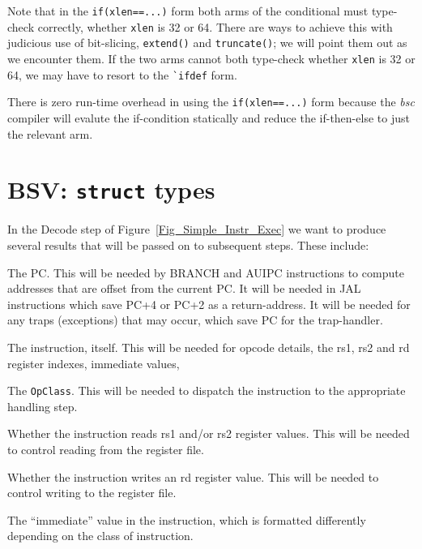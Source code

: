 Note that in the \verb|if(xlen==...)| form both arms of the
conditional must type-check correctly, whether \verb|xlen| is 32 or
64.  There are ways to achieve this with judicious use of bit-slicing,
\verb|extend()| and \verb|truncate()|; we will point them out as we
encounter them.  If the two arms cannot both type-check whether
\verb|xlen| is 32 or 64, we may have to resort to the \verb|`ifdef|
form.

There is zero run-time overhead in using the \verb|if(xlen==...)| form
because the \emph{bsc} compiler will evalute the if-condition
statically and reduce the if-then-else to just the relevant arm.


\section{BSV: {\tt struct} types}

\label{BSV_struct_types}


In the Decode step of Figure~\ref{Fig_Simple_Instr_Exec} we
want to produce several results that will be passed on to subsequent
steps.  These include:

\begin{tightlist}

\item The PC.  This will be needed by BRANCH and AUIPC instructions to
  compute addresses that are offset from the current PC.  It will be
  needed in JAL instructions which save PC+4 or PC+2 as a
  return-address.  It will be needed for any traps (exceptions) that
  may occur, which save PC for the trap-handler.

\item The instruction, itself.  This will be needed for opcode
  details, the rs1, rs2 and rd register indexes, immediate values,
  {\etc}

\item The \verb|OpClass|.  This will be needed to dispatch the
  instruction to the appropriate handling step.

\item Whether the instruction reads rs1 and/or rs2 register values.
  This will be needed to control reading from the register file.

\item Whether the instruction writes an rd register value.  This will
  be needed to control writing to the register file.

\item The ``immediate'' value in the instruction, which is formatted
  differently depending on the class of instruction.

\end{tightlist}

